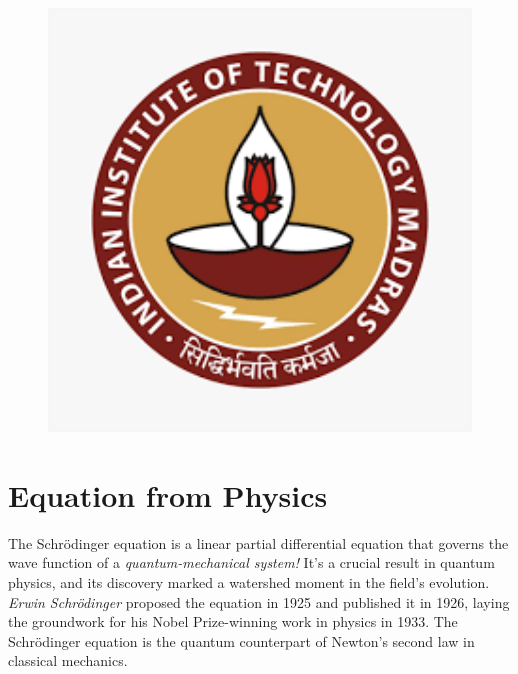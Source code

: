 \documentclass[a4paper, 12pt]{article}
\begin{document}
\begin{figure}[h]
\centering
\includegraphics[width=1\textwidth]{iitm.png}
\caption{\textit{\color{red}{Indian Institute of Technology, Madras}}}
\label{image-IIT Madras}
\end{figure}

 \title{}


\author{  \\  \\ Dhaval Raghwani \\ BE19B027 }

\date{\today}
\maketitle


\section{Equation from Physics}


The Schrödinger equation is a linear partial differential equation that governs the wave function of a  {\color{blue}\textit{quantum-mechanical system!}} It's a crucial result in quantum physics, and its discovery marked a watershed moment in the field's evolution. {\color{blue}\textit{Erwin Schrödinger}}  proposed the equation in 1925 and published it in 1926, laying the groundwork for his Nobel Prize-winning work in physics in 1933.  The Schrödinger equation is the quantum counterpart of Newton's second law in classical mechanics.
\end{document}
